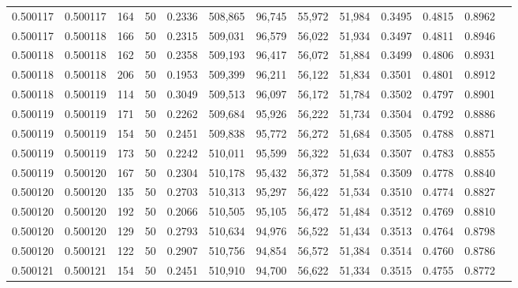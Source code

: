 \begin{tabular}{rrrrrrrrrrrrr}
0.500117 & 0.500117 &   164 &  50 &                                     0.2336 & 508,865 &  96,745 &  55,972 &  51,984 & 0.3495 & 0.4815 & 0.8962 \\
0.500117 & 0.500118 &   166 &  50 &                                     0.2315 & 509,031 &  96,579 &  56,022 &  51,934 & 0.3497 & 0.4811 & 0.8946 \\
0.500118 & 0.500118 &   162 &  50 &                                     0.2358 & 509,193 &  96,417 &  56,072 &  51,884 & 0.3499 & 0.4806 & 0.8931 \\
0.500118 & 0.500118 &   206 &  50 &                                     0.1953 & 509,399 &  96,211 &  56,122 &  51,834 & 0.3501 & 0.4801 & 0.8912 \\
0.500118 & 0.500119 &   114 &  50 &                                     0.3049 & 509,513 &  96,097 &  56,172 &  51,784 & 0.3502 & 0.4797 & 0.8901 \\
0.500119 & 0.500119 &   171 &  50 &                                     0.2262 & 509,684 &  95,926 &  56,222 &  51,734 & 0.3504 & 0.4792 & 0.8886 \\
0.500119 & 0.500119 &   154 &  50 &                                     0.2451 & 509,838 &  95,772 &  56,272 &  51,684 & 0.3505 & 0.4788 & 0.8871 \\
0.500119 & 0.500119 &   173 &  50 &                                     0.2242 & 510,011 &  95,599 &  56,322 &  51,634 & 0.3507 & 0.4783 & 0.8855 \\
0.500119 & 0.500120 &   167 &  50 &                                     0.2304 & 510,178 &  95,432 &  56,372 &  51,584 & 0.3509 & 0.4778 & 0.8840 \\
0.500120 & 0.500120 &   135 &  50 &                                     0.2703 & 510,313 &  95,297 &  56,422 &  51,534 & 0.3510 & 0.4774 & 0.8827 \\
0.500120 & 0.500120 &   192 &  50 &                                     0.2066 & 510,505 &  95,105 &  56,472 &  51,484 & 0.3512 & 0.4769 & 0.8810 \\
0.500120 & 0.500120 &   129 &  50 &                                     0.2793 & 510,634 &  94,976 &  56,522 &  51,434 & 0.3513 & 0.4764 & 0.8798 \\
0.500120 & 0.500121 &   122 &  50 &                                     0.2907 & 510,756 &  94,854 &  56,572 &  51,384 & 0.3514 & 0.4760 & 0.8786 \\
0.500121 & 0.500121 &   154 &  50 &                                     0.2451 & 510,910 &  94,700 &  56,622 &  51,334 & 0.3515 & 0.4755 & 0.8772 \\

\end{tabular}
